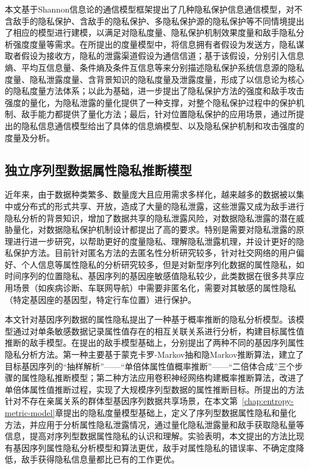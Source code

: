 本文基于Shannon信息论的通信模型框架提出了几种隐私保护信息通信模型，对不含敌手的隐私保护、含敌手的隐私保护、多隐私保护源的隐私保护等不同情境提出了相应的模型进行建模，以满足对隐私度量、隐私保护机制效果度量和敌手隐私分析强度度量等需求。在所提出的度量模型中，将信息拥有者假设为发送方，隐私谋取者假设为接收方，隐私的泄露渠道假设为通信信道；基于该假设，分别引入信息熵、平均互信息量、条件熵及条件互信息等来分别描述隐私保护系统信息源的隐私度量、隐私泄露度量、含背景知识的隐私度量及泄露度量，形成了以信息论为核心的隐私度量方法体系；以此为基础，进一步提出了隐私保护方法的强度和敌手攻击强度的量化，为隐私泄露的量化提供了一种支撑，对整个隐私保护过程中的保护机制、敌手能力都提供了量化方法；最后，针对位置隐私保护的应用场景，通过所提出的隐私信息通信模型给出了具体的信息熵模型、以及隐私保护机制和攻击强度的度量及分析。
\subsection{独立序列型数据属性隐私推断模型}
近年来，由于数据种类繁多、数量庞大且应用需求多样化，越来越多的数据被以集中或分布式的形式共享、开放，造成了大量的隐私泄露，这些泄露又成为敌手进行隐私分析的背景知识，增加了数据共享的隐私泄露风险，对数据隐私泄露的潜在威胁量化，对数据隐私保护机制设计都提出了高的要求。特别是需要对隐私泄露的原理进行进一步研究，以帮助更好的度量隐私、理解隐私泄露机理，并设计更好的隐私保护方法。目前针对匿名方法的去匿名性分析研究较多，针对社交网络的用户偏好、个人信息等属性隐私的分析研究较多，但是对新型序列化数据的属性隐私，如时间序列的位置隐私、基因序列的基因座敏感值隐私较少，此类数据在很多共享应用场景（如疾病诊断、车联网导航）中需要非匿名化，需要对其敏感的属性隐私（特定基因座的基因型，特定行车位置）进行保护。

本文针对基因序列数据的属性隐私提出了一种基于概率推断的隐私分析模型。该模型通过对单条敏感数据记录属性值存在的相互关联关系进行分析，构建目标属性值推断的敌手模型。在提出的敌手模型基础上，分别提出了两种不同的基因序列属性隐私分析方法。第一种主要基于蒙克卡罗-Markov抽和隐Markov推断算法，建立了目标基因序列的“抽样解析”——“单倍体属性值概率推断”——“二倍体合成”三个步骤的属性隐私推断模型；第二种方法应用卷积神经网络构建概率推断算法，改进了单倍体属性值推断过程，实现了大规模序列型数据的属性推断目标。所提出的方法针对不存在亲属关系的群体型基因序列数据共享场景，在本文第~\ref{chap:entropy-metric-model}章提出的隐私度量模型基础上，定义了序列型数据属性隐私和量化方法，并应用于分析属性隐私泄露情况，通过量化隐私泄露量和敌手获取隐私量等信息，提高对序列型数据属性隐私的认识和理解。实验表明，本文提出的方法比现有基因序列属性隐私分析模型和算法更优，敌手对属性隐私的错误率、不确定度降低，敌手获得隐私信息量都比已有的工作更优。
